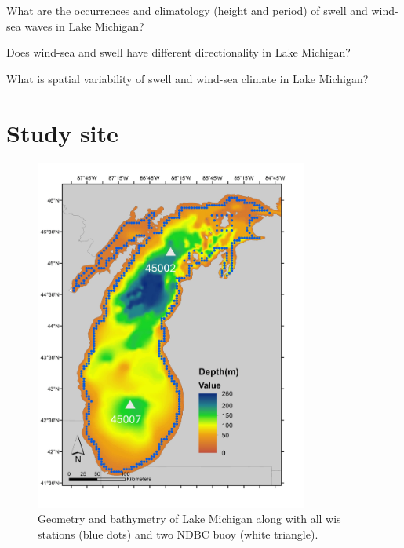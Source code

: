 What are the occurrences and climatology (\eg height and period) of swell and wind-sea waves in Lake
Michigan? 

Does wind-sea and swell have different directionality in Lake Michigan?

What is spatial variability of swell and wind-sea climate in Lake
Michigan?

\section{Study site}
\label{c4_study_site}

\begin{figure}[htbp]
  \centering
  \includegraphics[width=0.8\textwidth]{chapter4/resources/figure4-1.jpg}
  \caption{Geometry and bathymetry of Lake Michigan along with all wis stations (blue dots) and two NDBC buoy (white triangle).}
  \label{fig:fig4.1}
\end{figure}

